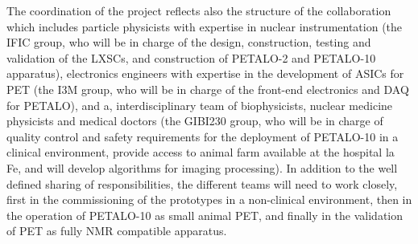 The coordination of the project reflects also the structure of the collaboration which includes particle physicists with expertise in nuclear instrumentation (the IFIC group, who will be in charge of the design, construction, testing and validation of the LXSCs, and construction of PETALO-2 and PETALO-10 apparatus), electronics engineers with expertise in the development of ASICs for PET (the I3M group, who will be in charge of the front-end electronics and DAQ for PETALO), and a, interdisciplinary team of biophysicists, nuclear medicine physicists and medical doctors (the GIBI230 group, who will be in charge of quality control and safety requirements for the deployment of PETALO-10 in a clinical environment, provide access to animal farm available at the hospital la Fe, and will develop algorithms for imaging processing). In addition to the well defined sharing of responsibilities, the different teams will need to work closely, first in the commissioning of the prototypes in a non-clinical environment, then in the operation of PETALO-10 as small animal PET, and finally in the validation of PET as fully NMR compatible apparatus.  
